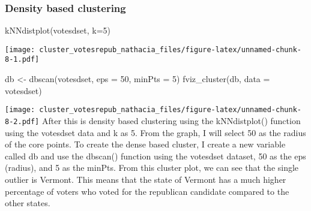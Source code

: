 \documentclass[
]{article}
\newenvironment{Shaded}{\begin{snugshade}}{\end{snugshade}}
\newcommand{\AttributeTok}[1]{\textcolor[rgb]{0.77,0.63,0.00}{#1}}
\newcommand{\DecValTok}[1]{\textcolor[rgb]{0.00,0.00,0.81}{#1}}
\newcommand{\FunctionTok}[1]{\textcolor[rgb]{0.00,0.00,0.00}{#1}}
\newcommand{\NormalTok}[1]{#1}
\newcommand{\OtherTok}[1]{\textcolor[rgb]{0.56,0.35,0.01}{#1}}
\begin{document}
\hypertarget{density-based-clustering}{%
\subsubsection{Density based
clustering}\label{density-based-clustering}}

\begin{Shaded}
\begin{Highlighting}[]
\FunctionTok{kNNdistplot}\NormalTok{(votesdset, }\AttributeTok{k=}\DecValTok{5}\NormalTok{)}
\end{Highlighting}
\end{Shaded}

\texttt{[image: cluster\_votesrepub\_nathacia\_files/figure-latex/unnamed-chunk-8-1.pdf]}

\begin{Shaded}
\begin{Highlighting}[]
\NormalTok{db }\OtherTok{\textless{}{-}} \FunctionTok{dbscan}\NormalTok{(votesdset, }\AttributeTok{eps =} \DecValTok{50}\NormalTok{, }\AttributeTok{minPts =} \DecValTok{5}\NormalTok{)}
\FunctionTok{fviz\_cluster}\NormalTok{(db, }\AttributeTok{data =}\NormalTok{ votesdset)}
\end{Highlighting}
\end{Shaded}

\texttt{[image: cluster\_votesrepub\_nathacia\_files/figure-latex/unnamed-chunk-8-2.pdf]}
After this is density based clustering using the kNNdistplot() function
using the votesdset data and k as 5. From the graph, I will select 50 as
the radius of the core points. To create the dense based cluster, I
create a new variable called db and use the dbscan() function using the
votesdset dataset, 50 as the eps (radius), and 5 as the minPts. From
this cluster plot, we can see that the single outlier is Vermont. This
means that the state of Vermont has a much higher percentage of voters
who voted for the republican candidate compared to the other states.
\end{document}
